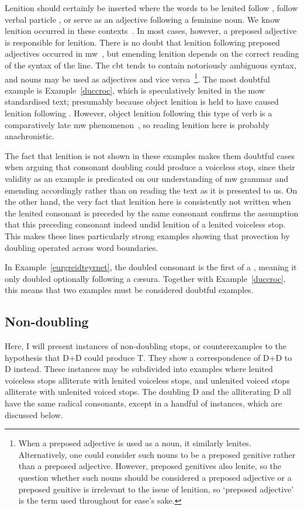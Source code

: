 Lenition should certainly be inserted where the words to be lenited follow , follow verbal particle , or serve as an adjective following a feminine noun. We know lenition occurred in these contexts~\autocite[\S\S 20, 22, 23]{evans_grammar_1964}. 
In most cases, however, a preposed adjective is responsible for lenition. There is no doubt that lenition following preposed adjectives occurred in \gls{mw}~\autocite[\S 20]{evans_grammar_1964}, but emending lenition depends on the correct reading of the syntax of the line. The \gls{cbt} tends to contain notoriously ambiguous syntax, and nouns may be used as adjectives and vice versa~\autocite{daniel_cyfuniadau_2003}\footnote{When a preposed adjective is used as a noun, it similarly lenites. Alternatively, one could consider such nouns to be a preposed genitive rather than a preposed adjective. However, preposed genitives also lenite, so the question whether such nouns should be considered a preposed adjective or a preposed genitive is irrelevant to the issue of lenition, so `preposed adjective' is the term used throughout for ease's sake.}. 
The most doubtful example is Example~\ref{duccroc}, which is speculatively lenited in the \gls{mow} standardised text; presumably because object lenition is held to have caused lenition following . However, object lenition following this type of verb is a comparatively late \gls{mw} phenomenon~\autocite[55-57]{van_development14}, so reading lenition here is probably anachronistic. 

The fact that lenition is not shown in these examples makes them doubtful cases when arguing that consonant doubling could produce a voiceless stop, since their validity as an example is predicated on our understanding of \gls{mw} grammar and emending accordingly rather than on reading the text as it is presented to us. On the other hand, the very fact that lenition here is consistently not written when the lenited consonant is preceded by the same consonant confirms the assumption that this preceding consonant indeed undid  lenition of a lenited voiceless stop. This makes these lines particularly strong examples showing that provection by doubling operated across word boundaries.

In Example~\ref{eurgreidteyrnet}, the doubled consonant is the first of a , meaning it only doubled optionally following a cæsura. Together with Example~\ref{duccroc}, this means that two examples must be considered doubtful examples.

\subsection{Non-doubling}
Here, I will present instances of non-doubling stops, or counterexamples to the hypothesis that \gls{D}+\gls{D} could produce \gls{T}. They show a correspondence of \gls{D}+\gls{D} to \gls{D} instead. These instances may be subdivided into examples where lenited voiceless stops alliterate with lenited voiceless stops, and unlenited voiced stops alliterate with unlenited voiced stops. The doubling \gls{D} and the alliterating \gls{D} all have the same radical consonants, except in a handful of instances, which are discussed below.

